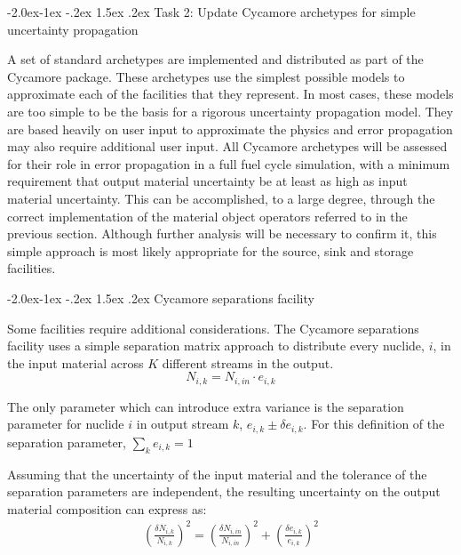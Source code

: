 \documentclass[dvips,12pt]{article}
\makeatletter
\newcommand{\unc}[1]
{ \delta #1 }
\newcommand{\uncratio}[1]
{ \left(\frac{\unc{#1}}{#1}\right) }
\newcommand{\uncratiosq}[1]
{ \uncratio{#1}^2 }
\renewcommand\subsection{\@startsection{subsection}{2}{\z@}%
                                     {-2.0ex\@plus -1ex \@minus -.2ex}%
                                     {1.5ex \@plus .2ex}%
                                     {\normalfont\bfseries}}%
\renewcommand\subsubsection{\@startsection{subsubsection}{3}{\z@}%
                                     {-2.0ex\@plus -1ex \@minus -.2ex}%
                                     {1.5ex \@plus .2ex}%
                                     {\normalfont\bfseries}}%
\makeatother
\begin{document}
\subsection{Task 2: Update Cycamore archetypes for simple uncertainty propagation}

A set of standard archetypes are implemented and
distributed as part of the Cycamore package.
These archetypes use the simplest possible models
to approximate each of the facilities that they
represent.  In most cases, these models are too
simple to be the basis for a rigorous uncertainty
propagation model.  They are based heavily on user
input to approximate the physics and error
propagation may also require additional user
input.  All Cycamore archetypes will be assessed
for their role in error propagation in a full fuel
cycle simulation, with a minimum requirement that
output material uncertainty be at least as high as
input material uncertainty.  This can be
accomplished, to a large degree, through the
correct implementation of the material object
operators referred to in the previous section.
Although further analysis will be necessary to
confirm it, this simple approach is most likely
appropriate for the source, sink
and storage facilities.

\subsubsection{Cycamore separations facility}

Some facilities require additional considerations.
The Cycamore separations facility uses a simple
separation matrix approach to distribute every
nuclide, $i$, in the input material across $K$
different streams in the output.
\begin{equation}
N_{i,k} = N_{i,in} \cdot e_{i,k}
\end{equation}

The only parameter which can introduce extra
variance is the separation parameter for nuclide
$i$ in output stream $k$, $e_{i,k} \pm \delta
e_{i,k}$.  For this definition of the separation
parameter, $\sum_k e_{i,k} = 1$

Assuming that the uncertainty of the input
material and the tolerance of the separation
parameters are independent, the resulting
uncertainty on the output material composition can
express as:
\begin{align}
  \uncratiosq{N_{i,k}} = \uncratiosq{N_{i,in}} +  \uncratiosq{e_{i,k}}
\end{align}
\end{document}
